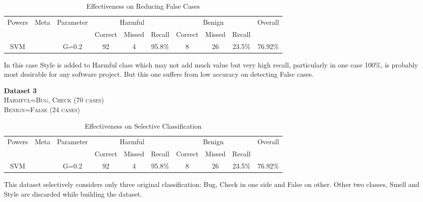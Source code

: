 \documentclass[11pt]{article}
\begin{document}
\begin{table}[h!]
\centering
\begin{tabular*}{.977\textwidth}{|c|c|c|c|c|c|c|c|c|c|}
\hline
\multicolumn{1}{|c|}{\multirow{2}{*}{Powers}} & 
\multicolumn{1}{|c|}{\multirow{2}{*}{Meta}} & 
\multicolumn{1}{|c|}{\multirow{2}{*}{Parameter}} & 
\multicolumn{3}{|c|}{Harmful} & 
\multicolumn{3}{|c|}{Benign} & 
\multicolumn{1}{|c|}{\multirow{2}{*}{Overall}} \\
\cline{4-9}

& & & Correct & Missed & Recall & Correct & Missed & Recall & \\
\hline
SVM & & G=0.2 & 92 & 4 & 95.8\% & 8 & 26 & 23.5\% & 76.92\% \\
\hline
\end{tabular*}
\caption{Effectiveness on Reducing False Cases}
\label{tab:dataset2}
\end{table}


\noindent
In this case Style is added to Harmful class which may not add much value but very high recall, particularly in one case 100\%, is probably most desirable for any software project. But this one suffers from low accuracy on detecting False cases.

\vspace{10 pt}
\noindent
\textbf{Dataset 3}\\
\textsc{Harmful=Bug, Check (70 cases)}\\
\textsc{Benign=False (24 cases)}\\

\begin{table}[h!]
\centering
\begin{tabular*}{.977\textwidth}{|c|c|c|c|c|c|c|c|c|c|}
\hline
\multicolumn{1}{|c|}{\multirow{2}{*}{Powers}} & 
\multicolumn{1}{|c|}{\multirow{2}{*}{Meta}} & 
\multicolumn{1}{|c|}{\multirow{2}{*}{Parameter}} & 
\multicolumn{3}{|c|}{Harmful} & 
\multicolumn{3}{|c|}{Benign} & 
\multicolumn{1}{|c|}{\multirow{2}{*}{Overall}} \\
\cline{4-9}

& & & Correct & Missed & Recall & Correct & Missed & Recall & \\
\hline
SVM & & G=0.2 & 92 & 4 & 95.8\% & 8 & 26 & 23.5\% & 76.92\% \\
\hline
\end{tabular*}
\caption{Effectiveness on Selective Classification}
\label{tab:dataset3}
\end{table}


\noindent
This dataset selectively considers only three original classification: Bug, Check in one side and False on other. Other two classes, Smell and Style are discarded while building the dataset.
\end{document}
